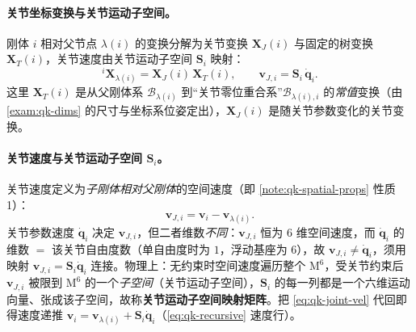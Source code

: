 \paragraph{关节坐标变换与关节运动子空间。}
刚体 $i$ 相对父节点 $\lambda(i)$ 的变换分解为关节变换 $\mathbf{X}_J(i)$ 与固定的树变换 $\mathbf{X}_T(i)$，关节速度由关节运动子空间 $\mathbf{S}_i$ 映射\cite{yu2021quadruped}：
\begin{equation}
  {}^{i}\mathbf{X}_{\lambda(i)}=\mathbf{X}_J(i)\,\mathbf{X}_T(i),
  \qquad
  \boldsymbol{v}_{J,i}=\mathbf{S}_i\,\dot{\boldsymbol{q}}_i.
  \label{eq:qk-joint-model}
\end{equation}
这里 $\mathbf{X}_T(i)$ 是从父刚体系 $\mathcal{B}_{\lambda(i)}$ 到“关节零位重合系”$\mathcal{B}_{\lambda(i),i}$ 的\emph{常值}变换（由 \cref{exam:qk-dims} 的尺寸与坐标系位姿定出），$\mathbf{X}_J(i)$ 是随关节参数变化的关节变换。

\paragraph{关节速度与关节运动子空间 $\mathbf{S}_i$。}
关节速度定义为\emph{子刚体相对父刚体}的空间速度（即 \cref{note:qk-spatial-props} 性质 1）\cite{yu2021quadruped}：
\begin{equation}
  \boldsymbol{v}_{J,i}=\boldsymbol{v}_i-\boldsymbol{v}_{\lambda(i)}.
  \label{eq:qk-joint-vel}
\end{equation}
关节参数速度 $\dot{\boldsymbol{q}}_i$ 决定 $\boldsymbol{v}_{J,i}$，但二者维数\emph{不同}：$\boldsymbol{v}_{J,i}$ 恒为 $6$ 维空间速度，而 $\dot{\boldsymbol{q}}_i$ 的维数 $=$ 该关节自由度数（单自由度时为 $1$，浮动基座为 $6$），故 $\boldsymbol{v}_{J,i}\neq\dot{\boldsymbol{q}}_i$，须用映射 $\boldsymbol{v}_{J,i}=\mathbf{S}_i\dot{\boldsymbol{q}}_i$ 连接\cite{yu2021quadruped}。物理上：无约束时空间速度遍历整个 $\mathrm{M}^6$，受关节约束后 $\boldsymbol{v}_{J,i}$ 被限到 $\mathrm{M}^6$ 的一个\emph{子空间}（关节运动子空间），$\mathbf{S}_i$ 的每一列都是一个六维运动向量、张成该子空间，故称\textbf{关节运动子空间映射矩阵}。把 \cref{eq:qk-joint-vel} 代回即得速度递推 $\boldsymbol{v}_i=\boldsymbol{v}_{\lambda(i)}+\mathbf{S}_i\dot{\boldsymbol{q}}_i$（\cref{eq:qk-recursive} 速度行）。

